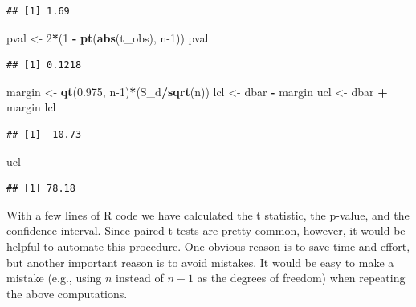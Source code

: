 \documentclass[
]{krantz}
\newenvironment{Shaded}{\begin{snugshade}}{\end{snugshade}}
\newcommand{\DecValTok}[1]{\textcolor[rgb]{0.00,0.00,0.81}{#1}}
\newcommand{\FloatTok}[1]{\textcolor[rgb]{0.00,0.00,0.81}{#1}}
\newcommand{\KeywordTok}[1]{\textcolor[rgb]{0.13,0.29,0.53}{\textbf{#1}}}
\newcommand{\NormalTok}[1]{#1}
\newcommand{\OperatorTok}[1]{\textcolor[rgb]{0.81,0.36,0.00}{\textbf{#1}}}
\newcommand{\StringTok}[1]{\textcolor[rgb]{0.31,0.60,0.02}{#1}}
\begin{document}
\begin{verbatim}
## [1] 1.69
\end{verbatim}

\begin{Shaded}
\begin{Highlighting}[]
\NormalTok{pval \textless{}{-}}\StringTok{ }\DecValTok{2}\OperatorTok{*}\NormalTok{(}\DecValTok{1} \OperatorTok{{-}}\StringTok{ }\KeywordTok{pt}\NormalTok{(}\KeywordTok{abs}\NormalTok{(t\_obs), n}\DecValTok{{-}1}\NormalTok{))}
\NormalTok{pval}
\end{Highlighting}
\end{Shaded}

\begin{verbatim}
## [1] 0.1218
\end{verbatim}

\begin{Shaded}
\begin{Highlighting}[]
\NormalTok{margin \textless{}{-}}\StringTok{ }\KeywordTok{qt}\NormalTok{(}\FloatTok{0.975}\NormalTok{, n}\DecValTok{{-}1}\NormalTok{)}\OperatorTok{*}\NormalTok{(S\_d}\OperatorTok{/}\KeywordTok{sqrt}\NormalTok{(n))}
\NormalTok{lcl \textless{}{-}}\StringTok{ }\NormalTok{dbar }\OperatorTok{{-}}\StringTok{ }\NormalTok{margin}
\NormalTok{ucl \textless{}{-}}\StringTok{ }\NormalTok{dbar }\OperatorTok{+}\StringTok{ }\NormalTok{margin}
\NormalTok{lcl}
\end{Highlighting}
\end{Shaded}

\begin{verbatim}
## [1] -10.73
\end{verbatim}

\begin{Shaded}
\begin{Highlighting}[]
\NormalTok{ucl}
\end{Highlighting}
\end{Shaded}

\begin{verbatim}
## [1] 78.18
\end{verbatim}

With a few lines of R code we have calculated the t statistic, the p-value, and the confidence interval. Since paired t tests are pretty common, however, it would be helpful to automate this procedure. One obvious reason is to save time and effort, but another important reason is to avoid mistakes. It would be easy to make a mistake (e.g., using \(n\) instead of \(n-1\) as the degrees of freedom) when repeating the above computations.
\end{document}
